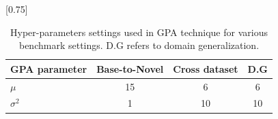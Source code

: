 \begin{table}[!h]

    \small \centering
 \setlength{\tabcolsep}{8pt}
    \scalebox{0.75}[0.75]{
    \begin{tabular}{l ccc}
    \toprule
    GPA parameter & Base-to-Novel  & Cross dataset & D.G\\
    \midrule
$\mu$ & 15& 6 & 6 \\
$\sigma^{2}$ & 1 & 10  & 10\\
    \bottomrule
    \end{tabular}
    }\vspace{-0.5em}
    \caption{Hyper-parameters settings used in GPA technique for various benchmark settings. D.G refers to domain generalization.
    }
    \label{tab_appendix:GPA_hyper_parameters}
\end{table}